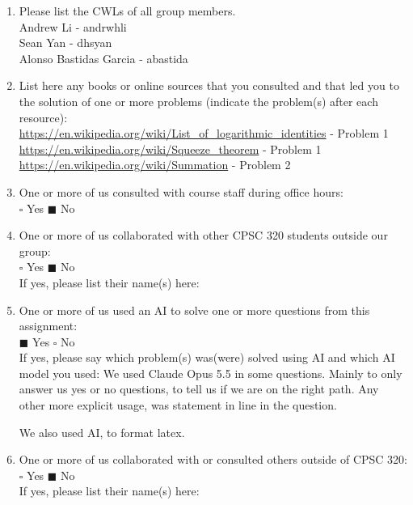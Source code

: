 \documentclass[letterpaper,11pt]{article}
\theoremstyle{plain}
\theoremstyle{definition}
\begin{document}
	\begin{enumerate}
        \item Please list the CWLs of all group members. \\
        \color{blue}
        Andrew Li - andrwhli \\
        Sean Yan - dhsyan \\
        Alonso Bastidas Garcia - abastida
        
        \color{black}
		\item List here any books or online sources that you consulted and that led you to the solution of one or more problems (indicate the problem(s) after each resource): \\
		\color{blue}
        \url{https://en.wikipedia.org/wiki/List_of_logarithmic_identities} - Problem 1 \\
        \url{https://en.wikipedia.org/wiki/Squeeze_theorem} - Problem 1 \\
        \url{https://en.wikipedia.org/wiki/Summation} - Problem 2 \\
        
        \color{black}
		\item One or more of us consulted with course staff during office hours:\\
		$\square$ Yes \hspace{.5in} $\blacksquare$ No
		
		\item One or more of us collaborated with other CPSC 320 students outside our group:\\		
		$\square$ Yes \hspace{.5in} $\blacksquare$ No\\
		If yes, please list their name(s) here:
        \color{blue}

        
        \color{black}
		\item One or more of us used an AI to solve one or more questions from this assignment:\\
        $\blacksquare$ Yes \hspace{.5in} $\square$ No\\

        \color{blue}
		If yes, please say which problem(s) was(were) solved using AI and which AI model you used:
        We used Claude Opus 5.5 in some questions. Mainly to only answer 
        us yes or no questions, to tell us if we are on the right path. 
        Any other more explicit usage, was statement in line in the question.

        We also used AI, to format latex. 
        
        \color{black}
        \item One or more of us collaborated with or consulted others outside of CPSC 320:\\
        $\square$ Yes \hspace{.5in} $\blacksquare$ No\\
		If yes, please list their name(s) here:
        \color{blue}

        
        
    \vspace{.1in}

	\end{enumerate}
 	   
\end{document}
